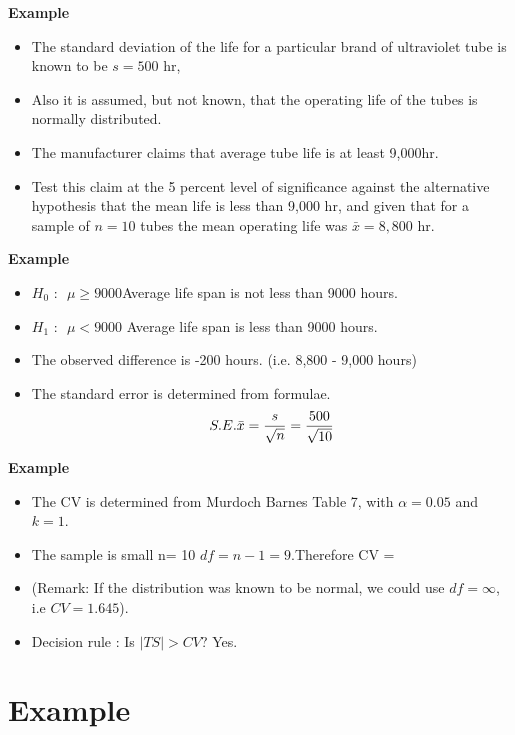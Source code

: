 
\textbf{Example}

\begin{itemize}
\item The standard deviation of the life for a particular brand of ultraviolet tube is known to be $s = 500$ hr,
\item Also it is assumed, but not known, that the operating life of the tubes is normally distributed. \item The manufacturer claims that average tube life
is at least 9,000hr. \item Test this claim at the 5 percent level of significance against the alternative hypothesis
that the mean life is less than 9,000 hr, and given that for a sample of $n = 10$ tubes the mean operating
life was $\bar{x}  =  8,800$ hr.
\end{itemize}

\textbf{Example}

\begin{itemize}
\item $H_0 \mbox{ : } $ $\mu \geq 9000$Average life span is not less than 9000 hours.
\item $H_1 \mbox{ : } $ $\mu < 9000$    Average life span is  less than 9000 hours.
\end{itemize}
\bigskip
\begin{itemize}
\item The observed difference is -200 hours. (i.e. 8,800 - 9,000 hours)
\item The standard error is determined from formulae.
\[ S.E. \bar{x}  = {s \over \sqrt{n}} = {500 \over \sqrt{10}} \]
\end{itemize}

\textbf{Example}

\begin{itemize}
\item The CV is determined from Murdoch Barnes Table 7, with $\alpha = 0.05$ and $k = 1$.
\item The sample is small n= 10  $df = n-1 = 9$.Therefore CV = 
\item (Remark: If the distribution was known to be normal, we could use $df = \infty$, i.e $CV = 1.645$).
\item Decision rule : Is $|TS| >CV$? Yes. 
\end{itemize}




\section{Example}


